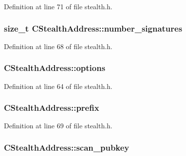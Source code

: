 Definition at line 71 of file stealth.\+h.

\hypertarget{class_c_stealth_address_a5c4d8f08483d31c17e6e711cdbe705ef}{}
\subsubsection[{number\+\_\+signatures}]{\setlength{\rightskip}{0pt plus 5cm}size\+\_\+t C\+Stealth\+Address\+::number\+\_\+signatures}\label{class_c_stealth_address_a5c4d8f08483d31c17e6e711cdbe705ef}


Definition at line 68 of file stealth.\+h.

\hypertarget{class_c_stealth_address_a5dc6e5ddb43a2ecdede5278abb9495ed}{}
\subsubsection[{options}]{ C\+Stealth\+Address\+::options}\label{class_c_stealth_address_a5dc6e5ddb43a2ecdede5278abb9495ed}


Definition at line 64 of file stealth.\+h.

\hypertarget{class_c_stealth_address_a588786324128a664096e99331db25d68}{}
\subsubsection[{prefix}]{ C\+Stealth\+Address\+::prefix}\label{class_c_stealth_address_a588786324128a664096e99331db25d68}


Definition at line 69 of file stealth.\+h.

\hypertarget{class_c_stealth_address_ae695d1d4c649d3f78b253de7d273b1d9}{}
\subsubsection[{scan\+\_\+pubkey}]{ C\+Stealth\+Address\+::scan\+\_\+pubkey}\label{class_c_stealth_address_ae695d1d4c649d3f78b253de7d273b1d9}


